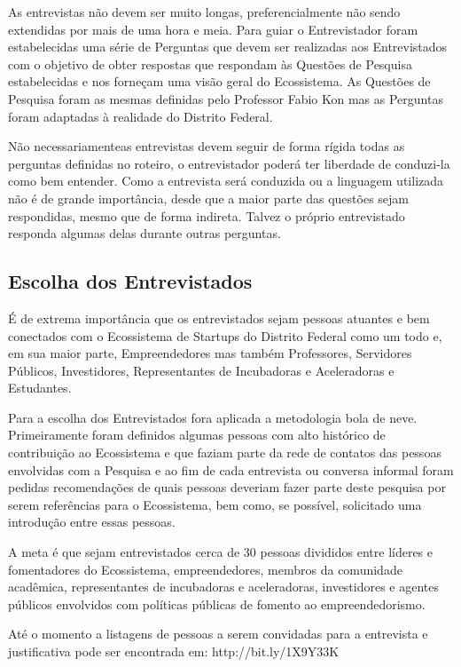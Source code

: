 As entrevistas não devem ser muito longas, preferencialmente não sendo extendidas por mais de uma hora e meia. Para guiar o Entrevistador foram estabelecidas uma série de Perguntas que devem ser realizadas aos Entrevistados com o objetivo de obter respostas que respondam às Questões de Pesquisa estabelecidas e nos forneçam uma visão geral do Ecossistema. As Questões de Pesquisa foram as mesmas definidas pelo Professor Fabio Kon mas as Perguntas foram adaptadas à realidade do Distrito Federal.

Não necessariamenteas entrevistas devem seguir de forma rígida todas as perguntas definidas no roteiro, o entrevistador poderá ter liberdade de conduzi-la como bem entender. Como a entrevista será conduzida ou a linguagem utilizada não é de grande importância, desde que a maior parte das questões sejam respondidas, mesmo que de forma indireta. Talvez o próprio entrevistado responda algumas delas durante outras perguntas. 

\subsection{Escolha dos Entrevistados}
\label{subsection:escolha_dos_entrevistados}

É de extrema importância que os entrevistados sejam pessoas atuantes e bem conectados com o Ecossistema de Startups do Distrito Federal como um todo e, em sua maior parte, Empreendedores mas também Professores, Servidores Públicos, Investidores, Representantes de Incubadoras e Aceleradoras e Estudantes. 

Para a escolha dos Entrevistados fora aplicada a metodologia bola de neve. Primeiramente foram definidos algumas pessoas com alto histórico de contribuição ao Ecossistema e que faziam parte da rede de contatos das pessoas envolvidas com a Pesquisa e ao fim de cada entrevista ou conversa informal foram pedidas recomendações de quais pessoas deveriam fazer parte deste pesquisa por serem referências para o Ecossistema, bem como, se possível, solicitado uma introdução entre essas pessoas. 

A meta é que sejam entrevistados cerca de 30 pessoas divididos entre líderes e fomentadores do Ecossistema, empreendedores, membros da comunidade acadêmica, representantes de incubadoras e aceleradoras, investidores e agentes públicos envolvidos com políticas públicas de fomento ao empreendedorismo. 

Até o momento a listagens de pessoas a serem convidadas para a entrevista e justificativa pode ser encontrada em: http://bit.ly/1X9Y33K

